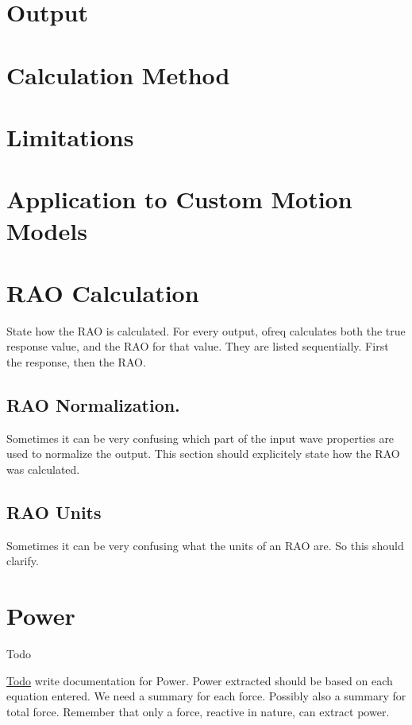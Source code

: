 \section*{Output}

\section*{Calculation Method}

\section*{Limitations}

\section*{Application to Custom Motion Models}

\section*{R\-A\-O Calculation}

State how the R\-A\-O is calculated. For every output, ofreq calculates both the true response value, and the R\-A\-O for that value. They are listed sequentially. First the response, then the R\-A\-O.

\subsection*{R\-A\-O Normalization.}

Sometimes it can be very confusing which part of the input wave properties are used to normalize the output. This section should explicitely state how the R\-A\-O was calculated.

\subsection*{R\-A\-O Units}

Sometimes it can be very confusing what the units of an R\-A\-O are. So this should clarify. \hypertarget{power}{}\section{Power}\label{power}
\begin{DoxyRefDesc}{Todo}
\item[\hyperlink{todo__todo000030}{Todo}]write documentation for Power. Power extracted should be based on each equation entered. We need a summary for each force. Possibly also a summary for total force. Remember that only a force, reactive in nature, can extract power.\end{DoxyRefDesc}


